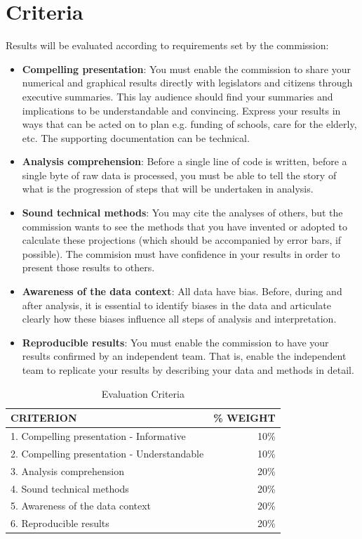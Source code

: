 \section{Criteria}
Results will be evaluated according to requirements set by the commission:
\begin{itemize}
	\item \textbf{Compelling presentation}: You must enable the commission to share your numerical and graphical results directly with legislators and citizens through executive summaries. This lay audience should find your summaries and implications to be understandable and convincing.  Express your results in ways that can be acted on to plan e.g. funding of schools, care for the elderly, etc. The supporting documentation can be technical.
	\item \textbf{Analysis comprehension}: Before a single line of code is written, before a single byte of raw data is processed, you must be able to tell the story of what is the progression of steps that will be undertaken in analysis.
	\item \textbf{Sound technical methods}: You may cite the analyses of others, but the commission wants to see the methods that you have invented or adopted to calculate these projections (which should be accompanied by error bars, if possible).  The commision must have confidence in your results in order to present those results to others.
	\item \textbf{Awareness of the data context}: All data have bias. Before, during and after analysis, it is essential to identify biases in the data and articulate clearly how these biases influence all steps of analysis and interpretation.
	\item \textbf{Reproducible results}: You must enable the commission to have your results confirmed by an independent team.  That is, enable the independent team to replicate your results by describing your data and methods in detail.
\end{itemize}

\begin{table}[htbp]
  \centering
  \caption{Evaluation Criteria}
    \begin{tabular}{|p{22em}|r|}
    \toprule
    \textbf{CRITERION} & \multicolumn{1}{p{8em}|}{\textbf{\% WEIGHT}} \\
    \midrule
    1. Compelling presentation - Informative & 10\% \\
    \midrule
    2. Compelling presentation - Understandable & 10\% \\
    \midrule
    3. Analysis comprehension & 20\% \\
    \midrule
    4. Sound technical methods & 20\% \\
    \midrule
    5. Awareness of the data context & 20\% \\
    \midrule
    6. Reproducible results & 20\% \\
    \bottomrule
    \end{tabular}%
  \label{tab:addlabel}%
\end{table}%


